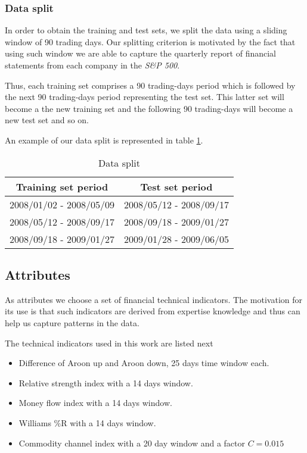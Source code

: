 \documentclass[preprint,3p,twocolumn]{elsarticle}
\begin{document}
\subsubsection{Data split}
\label{subsubsec:data split}
In order to obtain the training and test sets, we split the data using a sliding window of 90 trading days. Our splitting criterion is motivated by the fact that using such window we are able to capture the quarterly report of financial statements from each company in the \textit{S\&P 500}.

Thus, each training set comprises a 90 trading-days period which is followed by the next 90 trading-days period representing the test set. This latter set will become a the new training set and the following 90 trading-days will become a new test set and so on.

An example of our data split is represented in table \ref{table:data split}.

\begin{table}[h]
\centering
\begin{tabular}{cc}
\hline
\textbf{Training set period} & \textbf{Test set period} \\
\hline
2008/01/02 - 2008/05/09 & 2008/05/12 - 2008/09/17 \\
2008/05/12 - 2008/09/17 & 2008/09/18 - 2009/01/27 \\
2008/09/18 - 2009/01/27 & 2009/01/28 - 2009/06/05 \\
\hline
\end{tabular}
\caption{\label{table:data split} Data split}
\end{table}

\subsection{Attributes}
\label{subsec:attributes}
As attributes we choose a set of financial technical indicators. The motivation for its use is that such indicators are derived from expertise knowledge and thus can help us capture patterns in the data.

The technical indicators used in this work are listed next

\begin{itemize}
\item Difference of Aroon up and Aroon down, 25 days time window each.

\item Relative strength index with a 14 days window.

\item Money flow index with a 14 days window.

\item Williams \%R with a 14 days window.

\item Commodity channel index with a 20 day window and a factor $C = 0.015$
\end{itemize}
\end{document}

